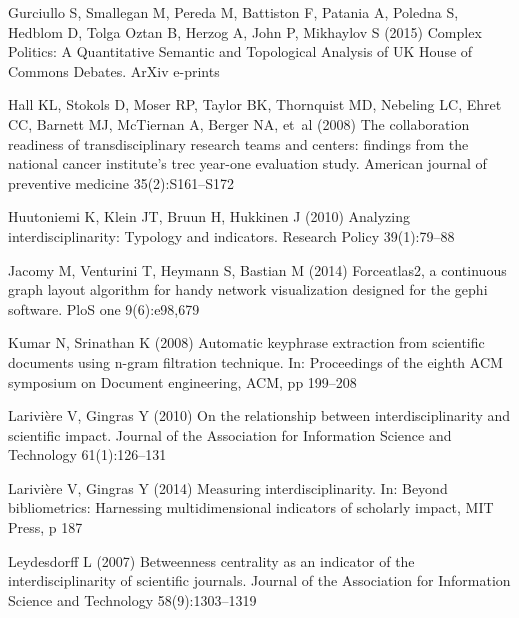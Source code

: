 \documentclass[10pt]{article}
\begin{document}
\begin{thebibliography}{84}
{Gurciullo} S, {Smallegan} M, {Pereda} M, {Battiston} F, {Patania} A, {Poledna}
  S, {Hedblom} D, {Tolga Oztan} B, {Herzog} A, {John} P, {Mikhaylov} S (2015)
  {Complex Politics: A Quantitative Semantic and Topological Analysis of UK
  House of Commons Debates}. ArXiv e-prints 

Hall KL, Stokols D, Moser RP, Taylor BK, Thornquist MD, Nebeling LC, Ehret CC,
  Barnett MJ, McTiernan A, Berger NA, et~al (2008) The collaboration readiness
  of transdisciplinary research teams and centers: findings from the national
  cancer institute's trec year-one evaluation study. American journal of
  preventive medicine 35(2):S161--S172

Huutoniemi K, Klein JT, Bruun H, Hukkinen J (2010) Analyzing
  interdisciplinarity: Typology and indicators. Research Policy 39(1):79--88

Jacomy M, Venturini T, Heymann S, Bastian M (2014) Forceatlas2, a continuous
  graph layout algorithm for handy network visualization designed for the gephi
  software. PloS one 9(6):e98,679

Kumar N, Srinathan K (2008) Automatic keyphrase extraction from scientific
  documents using n-gram filtration technique. In: Proceedings of the eighth
  ACM symposium on Document engineering, ACM, pp 199--208

Larivi{\`e}re V, Gingras Y (2010) On the relationship between
  interdisciplinarity and scientific impact. Journal of the Association for
  Information Science and Technology 61(1):126--131

Larivi{\`e}re V, Gingras Y (2014) Measuring interdisciplinarity. In: Beyond
  bibliometrics: Harnessing multidimensional indicators of scholarly impact,
  MIT Press, p 187

Leydesdorff L (2007) Betweenness centrality as an indicator of the
  interdisciplinarity of scientific journals. Journal of the Association for
  Information Science and Technology 58(9):1303--1319


\end{thebibliography}
\end{document}
